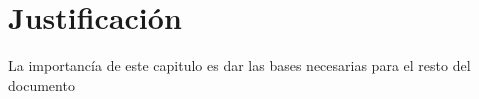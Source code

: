 \clearpage

\section{Justificación}
\label{sec:Intro}
La importancía de este capitulo es dar las bases necesarias para el resto del documento

